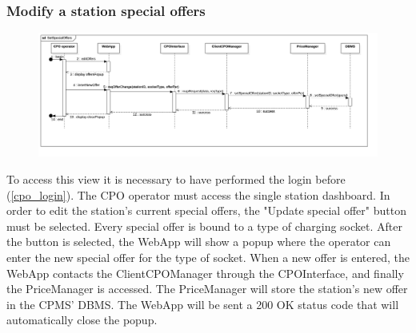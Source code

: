 \subsubsection{Modify a station special offers}
\begin{figure}[H]
    \begin{center}
        \includegraphics[width=\textwidth]{img/runtime/cpo_offers}
    \end{center}
\end{figure}
To access this view it is necessary to have performed the login before (\ref{cpo_login}). The CPO operator must access the single station dashboard. In order to edit the station's current special offers, the "Update special offer" button must be selected. Every special offer is bound to a type of charging socket. After the button is selected, the WebApp will show a popup where the operator can enter the new special offer for the type of socket.
When a new offer is entered, the WebApp contacts the ClientCPOManager through the CPOInterface, and finally the PriceManager is accessed. The PriceManager will store the station's new offer in the CPMS' DBMS. The WebApp will be sent a 200 OK status code that will automatically close the popup.

